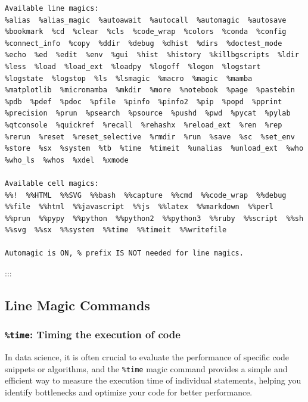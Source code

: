 \documentclass[
  letterpaper,
  DIV=11,
  numbers=noendperiod]{scrreprt}
\begin{document}
\begin{verbatim}
Available line magics:
%alias  %alias_magic  %autoawait  %autocall  %automagic  %autosave  %bookmark  %cd  %clear  %cls  %code_wrap  %colors  %conda  %config  %connect_info  %copy  %ddir  %debug  %dhist  %dirs  %doctest_mode  %echo  %ed  %edit  %env  %gui  %hist  %history  %killbgscripts  %ldir  %less  %load  %load_ext  %loadpy  %logoff  %logon  %logstart  %logstate  %logstop  %ls  %lsmagic  %macro  %magic  %mamba  %matplotlib  %micromamba  %mkdir  %more  %notebook  %page  %pastebin  %pdb  %pdef  %pdoc  %pfile  %pinfo  %pinfo2  %pip  %popd  %pprint  %precision  %prun  %psearch  %psource  %pushd  %pwd  %pycat  %pylab  %qtconsole  %quickref  %recall  %rehashx  %reload_ext  %ren  %rep  %rerun  %reset  %reset_selective  %rmdir  %run  %save  %sc  %set_env  %store  %sx  %system  %tb  %time  %timeit  %unalias  %unload_ext  %who  %who_ls  %whos  %xdel  %xmode

Available cell magics:
%%!  %%HTML  %%SVG  %%bash  %%capture  %%cmd  %%code_wrap  %%debug  %%file  %%html  %%javascript  %%js  %%latex  %%markdown  %%perl  %%prun  %%pypy  %%python  %%python2  %%python3  %%ruby  %%script  %%sh  %%svg  %%sx  %%system  %%time  %%timeit  %%writefile

Automagic is ON, % prefix IS NOT needed for line magics.
\end{verbatim}

:::

\hypertarget{line-magic-commands}{%
\subsection{Line Magic Commands}\label{line-magic-commands}}

\hypertarget{time-timing-the-execution-of-code}{%
\subsubsection{\texorpdfstring{\texttt{\%time}: Timing the execution of
code}{\%time: Timing the execution of code}}\label{time-timing-the-execution-of-code}}

In data science, it is often crucial to evaluate the performance of
specific code snippets or algorithms, and the \texttt{\%time} magic
command provides a simple and efficient way to measure the execution
time of individual statements, helping you identify bottlenecks and
optimize your code for better performance.
\end{document}
